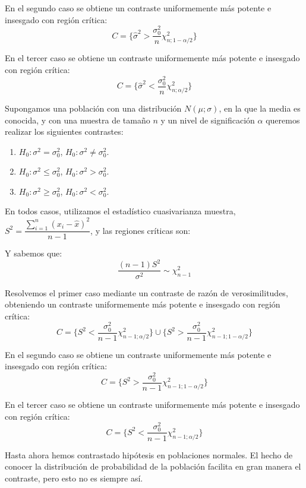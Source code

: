 En el segundo caso se obtiene un contraste uniformemente m\'as potente e insesgado con regi\'on cr\'itica:
\[C=\{\hat{\sigma}^2>\dfrac{\sigma_0^2}{n}\chi^2_{n;1-\alpha/2}\}\]

En el tercer caso se obtiene un contraste uniformemente m\'as potente e insesgado con regi\'on cr\'itica:
\[C=\{\hat{\sigma}^2<\dfrac{\sigma_0^2}{n}\chi^2_{n;\alpha/2}\}\]

Supongamos una poblaci\'on con una distribuci\'on $N(\mu;\sigma)$, en la que la media es conocida, y con una muestra de tama\~no $n$ y un nivel de significaci\'on $\alpha$ queremos realizar los siguientes contrastes:
\begin{enumerate}
\item $H_0:\sigma^2=\sigma^2_0$, $H_0:\sigma^2\neq\sigma^2_0$.
\item $H_0:\sigma^2\leq\sigma^2_0$, $H_0:\sigma^2>\sigma^2_0$.
\item $H_0:\sigma^2\geq\sigma^2_0$, $H_0:\sigma^2<\sigma^2_0$.
\end{enumerate}

En todos casos, utilizamos el estad\'istico cuasivarianza muestra, $S^2=\dfrac{\sum_{i=1}^n(x_i-\hat{x})^2}{n-1}$, y las regiones cr\'iticas son:

Y sabemos que:
\[\dfrac{(n-1)S^2}{\sigma^2}\sim \chi^2_{n-1}\]

Resolvemos el primer caso mediante un contraste de raz\'on de verosimilitudes, obteniendo un contraste uniformemente m\'as potente e insesgado con regi\'on cr\'itica:
\[C=\{S^2<\dfrac{\sigma_0^2}{n-1}\chi^2_{n-1;\alpha/2}\} \cup \{S^2>\dfrac{\sigma_0^2}{n-1}\chi^2_{n-1;1-\alpha/2}\}\]

En el segundo caso se obtiene un contraste uniformemente m\'as potente e insesgado con regi\'on cr\'itica:
\[C=\{S^2>\dfrac{\sigma_0^2}{n-1}\chi^2_{n-1;1-\alpha/2}\}\]

En el tercer caso se obtiene un contraste uniformemente m\'as potente e insesgado con regi\'on cr\'itica:
\[C=\{S^2<\dfrac{\sigma_0^2}{n-1}\chi^2_{n-1;\alpha/2}\}\]



Hasta ahora hemos contrastado hip\'otesis en poblaciones normales. El hecho de conocer la distribuci\'on de probabilidad de la poblaci\'on facilita en gran manera el contraste, pero esto no es siempre as\'i.

